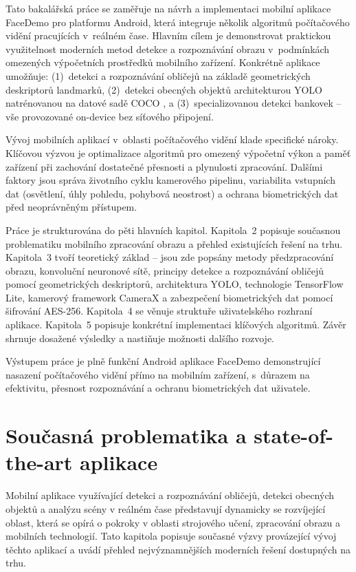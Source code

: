 \documentclass[FM,BP,CZ]{tulthesis}
\begin{document}
Tato bakalářská práce se zaměřuje na návrh a implementaci mobilní aplikace FaceDemo pro platformu Android, která integruje několik algoritmů počítačového vidění pracujících v~reálném čase. Hlavním cílem je demonstrovat praktickou využitelnost moderních metod detekce a rozpoznávání obrazu v~podmínkách omezených výpočetních prostředků mobilního zařízení. Konkrétně aplikace umožňuje: (1)~detekci a rozpoznávání obličejů na základě geometrických deskriptorů landmarků, (2)~detekci obecných objektů architekturou YOLO \cite{redmon2016yolo} natrénovanou na datové sadě COCO \cite{lin2014coco}, a (3)~specializovanou detekci bankovek -- vše provozované on-device bez síťového připojení.

Vývoj mobilních aplikací v~oblasti počítačového vidění klade specifické nároky. Klíčovou výzvou je optimalizace algoritmů pro omezený výpočetní výkon a paměť zařízení při zachování dostatečné přesnosti a plynulosti zpracování. Dalšími faktory jsou správa životního cyklu kamerového pipelinu, variabilita vstupních dat (osvětlení, úhly pohledu, pohybová neostrost) a ochrana biometrických dat před neoprávněným přístupem.

Práce je strukturována do pěti hlavních kapitol. Kapitola~2 popisuje současnou problematiku mobilního zpracování obrazu a přehled existujících řešení na trhu. Kapitola~3 tvoří teoretický základ -- jsou zde popsány metody předzpracování obrazu, konvoluční neuronové sítě, principy detekce a rozpoznávání obličejů pomocí geometrických deskriptorů, architektura YOLO, technologie TensorFlow Lite, kamerový framework CameraX a zabezpečení biometrických dat pomocí šifrování AES-256. Kapitola~4 se věnuje struktuře uživatelského rozhraní aplikace. Kapitola~5 popisuje konkrétní implementaci klíčových algoritmů. Závěr shrnuje dosažené výsledky a nastiňuje možnosti dalšího rozvoje.

Výstupem práce je plně funkční Android aplikace FaceDemo demonstrující nasazení počítačového vidění přímo na mobilním zařízení, s~důrazem na efektivitu, přesnost rozpoznávání a ochranu biometrických dat uživatele.

\chapter{Současná problematika a state-of-the-art aplikace}
\label{chap:state}
Mobilní aplikace využívající detekci a rozpoznávání obličejů, detekci obecných objektů a analýzu scény v reálném čase představují dynamicky se rozvíjející oblast, která se opírá o pokroky v oblasti strojového učení, zpracování obrazu a mobilních technologií. Tato kapitola popisuje současné výzvy provázející vývoj těchto aplikací a uvádí přehled nejvýznamnějších moderních řešení dostupných na trhu.
\end{document}
